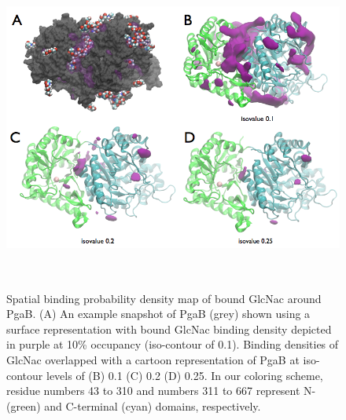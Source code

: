 \begin{figure}[htbp]
\centering
\includegraphics[height=4.25in, width=6in]{figures/results4/figure_pgab_density.png}
\caption[NAG binding density]{Spatial binding probability density map of bound GlcNac around PgaB.  (A) An example snapshot of PgaB (grey) shown using a surface representation with bound GlcNac binding density depicted in purple at 10\% occupancy (iso-contour of 0.1). Binding densities of GlcNac overlapped with a cartoon representation of PgaB at iso-contour levels of (B) 0.1 (C) 0.2 (D) 0.25. In our coloring scheme, residue numbers 43 to 310 and numbers 311 to 667 represent N- (green) and C-terminal (cyan) domains, respectively.}
\label{fig:pgab_density}
\end{figure}

